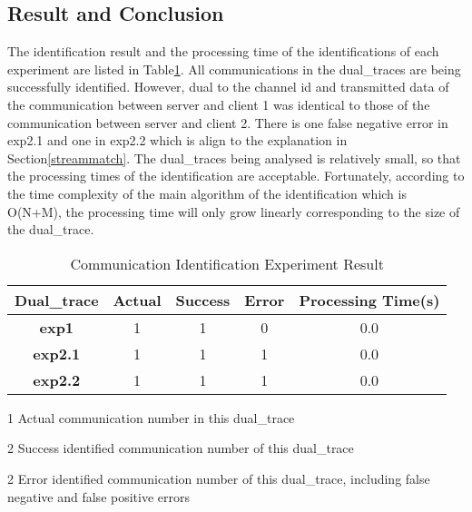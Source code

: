 \subsection{Result and Conclusion}
The identification result and the processing time of the identifications of each experiment are listed in Table\ref{expresult}. All communications in the dual\_traces are being successfully identified. However, dual to the channel id and transmitted data of the communication between server and client 1 was identical to those of the communication  between server and client 2. There is one false negative error in exp2.1 and one in exp2.2 which is align to the explanation in Section\ref{streammatch}. The dual\_traces being analysed is relatively small, so that the processing times of the identification are acceptable. Fortunately, according to the time complexity of the main algorithm of the identification which is O(N+M), the processing time will only grow linearly corresponding to the size of the dual\_trace.

    \begin{table}[H]
        \centering
        \caption{Communication Identification Experiment Result}
        \label{expresult}
        \begin{threeparttable}
        \begin{tabular}{|c|c|c|c|c|}
            \hline
            \textbf{Dual\_trace}&\textbf{Actual}\tnote{1}& \textbf{Success}\tnote{2}& \textbf{Error}\tnote{3} & \textbf{Processing Time(s)} \\
             \hline
             \textbf{exp1} &1&1&0&0.0\\
            \hline
             \textbf{exp2.1}&1&1&1&    0.0\\
            \hline
             \textbf{exp2.2}&1&1&1&0.0\\
            \hline
        \end{tabular}
        \begin{tablenotes}
            \item[1] Actual communication number in this dual\_trace
            \item[2] Success identified communication number of this dual\_trace
            \item[2] Error identified communication number of this dual\_trace, including false negative and false positive errors
        \end{tablenotes}
        \end{threeparttable}
    \end{table}




